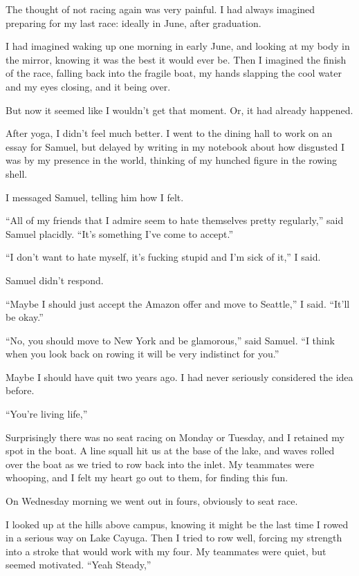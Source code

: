 The thought of not racing again was very painful.  I had always imagined
preparing for my last race: ideally in June, after graduation.

I had imagined waking up one morning in early June, and looking at my body in
the mirror, knowing it was the best it would ever be.  Then I imagined  the
finish of the race, falling back into the fragile boat, my hands slapping the
cool water and my eyes closing, and it being over.

But now it seemed like I wouldn't get that moment.  Or, it had already happened.

After yoga, I didn't feel much better.  I went to the dining hall to work on an
essay for Samuel, but delayed by writing in my notebook about how disgusted I
was by my presence in the world, thinking of my hunched figure in the rowing
shell.

I messaged Samuel, telling him how I felt.

``All of my friends that I admire seem to hate themselves pretty regularly,''
said Samuel placidly.  ``It's something I've come to accept.''

``I don't want to hate myself, it's fucking stupid and I'm sick of it,'' I said.  

Samuel didn't respond.

``Maybe I should just accept the Amazon offer and move to Seattle,'' I said.
``It'll be okay.''

``No, you should move to New York and be glamorous,'' said Samuel.  ``I think
when you look back on rowing it will be very indistinct for you.'' 

Maybe I should have quit two years ago.  I had never seriously considered the
idea before.

``You're living life,''

Surprisingly there was no seat racing on Monday or Tuesday, and I retained my
spot in the boat.  A line squall hit us at the base of the lake, and waves
rolled over the boat as we tried to row back into the inlet.  My teammates were
whooping, and I felt my heart go out to them, for finding this fun.

On Wednesday morning we went out in fours, obviously to seat race.

I looked up at the hills above campus, knowing it might be the last time I rowed
in a serious way on Lake Cayuga.  Then I tried to row well, forcing my strength
into a stroke that would work with my four.  My teammates were quiet, but seemed
motivated. ``Yeah Steady,'' 

